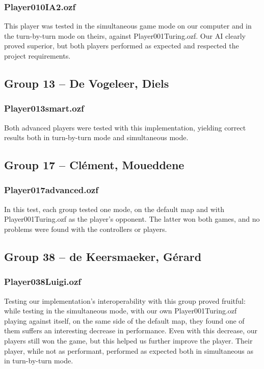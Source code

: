 \documentclass[12pt,journal]{IEEEtran}
\newcommand{\ntt}{\normalfont\ttfamily}
\newcommand{\fn}[1]{{\protect\ntt#1}}
\begin{document}
\subsubsection{\fn{Player010IA2.ozf}}
This player was tested in the simultaneous game mode on our computer and in the turn-by-turn mode on theirs, against \fn{Player001Turing.ozf}.
Our AI clearly proved superior, but both players performed as expected and respected the project requirements.

\subsection{Group 13 -- De Vogeleer, Diels}
\subsubsection{\fn{Player013smart.ozf}}
Both advanced players were tested with this implementation, yielding correct results both in turn-by-turn mode and simultaneous mode.

\subsection{Group 17 -- Clément, Moueddene}
\subsubsection{\fn{Player017advanced.ozf}}
In this test, each group tested one mode, on the default map and with \fn{Player001Turing.ozf} as the player's opponent.
The latter won both games, and no problems were found with the controllers or players.

\subsection{Group 38 -- de Keersmaeker, Gérard}
\subsubsection{\fn{Player038Luigi.ozf}}
Testing our implementation's interoperability with this group proved fruitful: while testing in the simultaneous mode, with our own \fn{Player001Turing.ozf} playing against itself, on the same side of the default map, they found one of them suffers an interesting decrease in performance.
Even with this decrease, our players still won the game, but this helped us further improve the player.
Their player, while not as performant, performed as expected both in simultaneous as in turn-by-turn mode.
\end{document}
